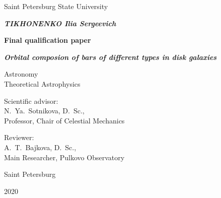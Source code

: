 \begin{titlepage}
  \centering
  {Saint Petersburg State University \par}
  
  \vspace{2cm}

  {\bfseries \itshape\MakeUppercase{Tikhonenko} Ilia Sergeevich\par}
  \vspace{0.5\baselineskip}
  {\bfseries Final qualification paper\par}
  \vspace{0.5\baselineskip}
  {\bfseries \itshape Orbital composion of bars of different types in disk galaxies\par}
  \vspace{2cm}
  {
    \begin{spacing}{1.0}
    ${}$\\ 
    ${}$\\
    Astronomy\\
    Theoretical Astrophysics
    \end{spacing}
  }
  \vspace{1cm}
  \begin{flushright}
    \parbox{0.5\textwidth}{
    \singlespacing
      {Scientific advisor:} \\
      N.~Ya.~Sotnikova, D.~Sc.,\\
      Professor, Chair of Celestial Mechanics\\
    }
  \end{flushright}
  \par
  \begin{flushright}
    \parbox{0.5\textwidth}{
    \singlespacing
      {Reviewer:} \\
      A.~T.~Bajkova, D.~Sc.,\\
      Main Researcher, Pulkovo Observatory%
    }
  \end{flushright}
  
  \vfill
  
  {Saint Petersburg \par}
  {2020}
\end{titlepage}
